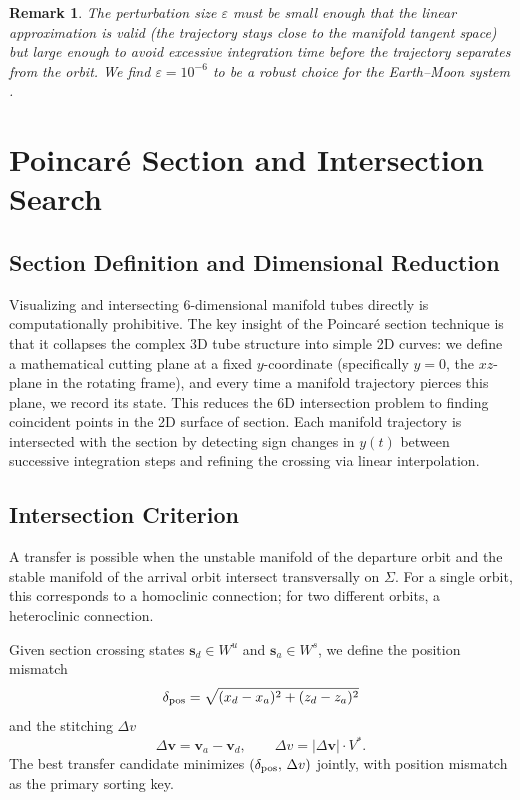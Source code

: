 \documentclass[12pt, a4paper]{article}
\newcommand{\dv}{\Delta v}
\newtheorem{remark}{Remark}
\begin{document}
\begin{remark}
The perturbation size $\varepsilon$ must be small enough that the linear
approximation is valid (the trajectory stays close to the manifold tangent
space) but large enough to avoid excessive integration time before the
trajectory separates from the orbit.
We find $\varepsilon = 10^{-6}$ to be a robust choice for the Earth--Moon
system \citep{KoonLoMarsdenRoss2008}.
\end{remark}

\section{Poincaré Section and Intersection Search}
\label{sec:poincare}

\subsection{Section Definition and Dimensional Reduction}

Visualizing and intersecting 6-dimensional manifold tubes directly is
computationally prohibitive.
The key insight of the Poincaré section technique is that it collapses
the complex 3D tube structure into simple 2D curves:
we define a mathematical cutting plane at a fixed $y$-coordinate
(specifically $y=0$, the $xz$-plane in the rotating frame), and every time
a manifold trajectory pierces this plane, we record its state.
This reduces the 6D intersection problem to finding coincident points in
the 2D surface of section.
Each manifold trajectory is intersected with the section by detecting sign
changes in $y(t)$ between successive integration steps and refining the
crossing via linear interpolation.

\subsection{Intersection Criterion}

A transfer is possible when the unstable manifold of the departure orbit
and the stable manifold of the arrival orbit intersect transversally on
$\Sigma$.
For a single orbit, this corresponds to a homoclinic connection; for two
different orbits, a heteroclinic connection.

Given section crossing states $\mathbf{s}_d \in W^u$ and
$\mathbf{s}_a \in W^s$, we define the position mismatch
\begin{equation}
  \delta_{\rm pos} = \sqrt{(x_d-x_a)^2 + (z_d-z_a)^2}
\end{equation}
and the stitching $\Delta v$
\begin{equation}
  \Delta\mathbf{v} = \mathbf{v}_a - \mathbf{v}_d,\qquad
  \dv = |\Delta\mathbf{v}| \cdot V^*.
  \label{eq:dv_stitch}
\end{equation}
The best transfer candidate minimizes $(\delta_{\rm pos},\, \dv)$ jointly,
with position mismatch as the primary sorting key.
\end{document}
